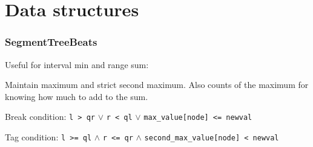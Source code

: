 \chapter{Data structures}

\subsection{SegmentTreeBeats}
Useful for interval min and range sum: 

Maintain maximum and strict second maximum. Also counts of the maximum for knowing how much to add to the sum.

Break condition: \texttt{l > qr} $\lor$ \texttt{r < ql} $\lor$ \texttt{max_value[node] <= newval}

Tag condition: \texttt{l >= ql} $\land$ \texttt{r <= qr} $\land$ \texttt{second_max_value[node] < newval}

